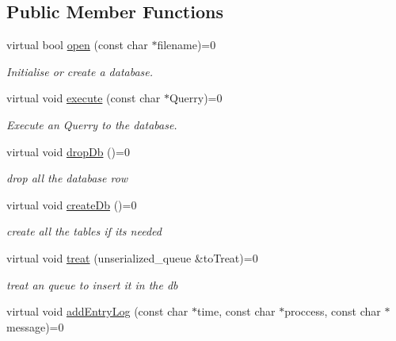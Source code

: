 \subsection*{Public Member Functions}
\begin{DoxyCompactItemize}
\item 
virtual bool \hyperlink{classspider_1_1_i_database_a307a753933fa76e57a96dfbb65489cc7}{open} (const char $\ast$filename)=0
\begin{DoxyCompactList}\small\item\em Initialise or create a database. \end{DoxyCompactList}\item 
virtual void \hyperlink{classspider_1_1_i_database_ab5179b84a43043a685bdc53447393779}{execute} (const char $\ast$Querry)=0
\begin{DoxyCompactList}\small\item\em Execute an Querry to the database. \end{DoxyCompactList}\item 
\mbox{\label{classspider_1_1_i_database_a619f1c1479891d1ff0599fd96281280a}} 
virtual void \hyperlink{classspider_1_1_i_database_a619f1c1479891d1ff0599fd96281280a}{drop\+Db} ()=0
\begin{DoxyCompactList}\small\item\em drop all the database row \end{DoxyCompactList}\item 
\mbox{\label{classspider_1_1_i_database_af93e0077e55af0e91b8ff54e982b6d3b}} 
virtual void \hyperlink{classspider_1_1_i_database_af93e0077e55af0e91b8ff54e982b6d3b}{create\+Db} ()=0
\begin{DoxyCompactList}\small\item\em create all the tables if it\textquotesingle{}s needed \end{DoxyCompactList}\item 
virtual void \hyperlink{classspider_1_1_i_database_ad5f4a8f7bd0936833d50c126f203a7c5}{treat} (unserialized\+\_\+queue \&to\+Treat)=0
\begin{DoxyCompactList}\small\item\em treat an queue to insert it in the db \end{DoxyCompactList}\item 
virtual void \hyperlink{classspider_1_1_i_database_abd4a02abea860308486d908b9007a5db}{add\+Entry\+Log} (const char $\ast$time, const char $\ast$proccess, const char $\ast$message)=0

\end{DoxyCompactItemize}
